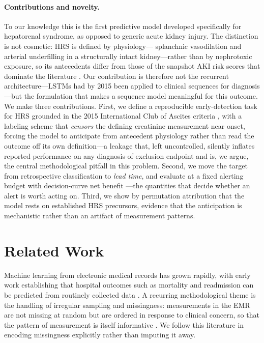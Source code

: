 \documentclass{article}
\begin{document}
\paragraph{Contributions and novelty.} To our knowledge this is the first predictive
model developed specifically for hepatorenal syndrome, as opposed to generic acute
kidney injury. The distinction is not cosmetic: HRS is defined by physiology---
splanchnic vasodilation and arterial underfilling in a structurally intact
kidney---rather than by nephrotoxic exposure, so its antecedents differ from those of
the snapshot AKI risk scores that dominate the literature \citep{Matheny2010}. Our
contribution is therefore not the recurrent architecture---LSTMs had by 2015 been
applied to clinical sequences for diagnosis \citep{Lipton2015}---but the formulation
that makes a sequence model meaningful for this outcome. We make three contributions.
First, we define a reproducible early-detection task for HRS grounded in the 2015
International Club of Ascites criteria \citep{Angeli2015}, with a labeling scheme that
\emph{censors} the defining creatinine measurement near onset, forcing the model to
anticipate from antecedent physiology rather than read the outcome off its own
definition---a leakage that, left uncontrolled, silently inflates reported
performance on any diagnosis-of-exclusion endpoint and is, we argue, the central
methodological pitfall in this problem. Second, we move the target from retrospective
classification to \emph{lead time}, and evaluate at a fixed alerting budget with
decision-curve net benefit \citep{Vickers2006}---the quantities that decide whether an
alert is worth acting on. Third, we show by permutation attribution that the model
rests on established HRS precursors, evidence that the anticipation is mechanistic
rather than an artifact of measurement patterns.

\section{Related Work}

Machine learning from electronic medical records has grown rapidly, with early
work establishing that hospital outcomes such as mortality and readmission can be
predicted from routinely collected data \citep{Ghassemi2014,Pirracchio2015}. A
recurring methodological theme is the handling of irregular sampling and
missingness: measurements in the EMR are not missing at random but are ordered in
response to clinical concern, so that the pattern of measurement is itself
informative \citep{Lipton2015,Marlin2012}. We follow this literature in encoding
missingness explicitly rather than imputing it away.
\end{document}
